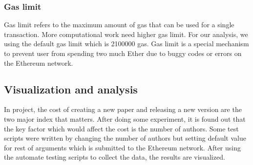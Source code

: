 \documentclass[openany,12pt]{ecsthesis}      %
\begin{document}
\subsubsection{Gas limit}
Gas limit refers to the maximum amount of gas that can be used for a single transaction.
More computational work need higher gas limit. For our analysis, we using the default gas limit which is 2100000 gas.
Gas limit is a special mechanism to prevent user from spending two much Ether due to buggy codes or errors on the Ethereum network. 
\subsection{Visualization and analysis}
In project, the cost of creating a new paper and releasing a new version are the two major index that matters.
After doing some experiment, it is found out that the key factor which would affect the cost is the number of authors.
Some test scripts were written by changing the number of authors 
but setting default value for rest of arguments which is submitted to the Ethereum network.
After using the automate testing scripts to collect the data, the results are visualized.
\end{document}
